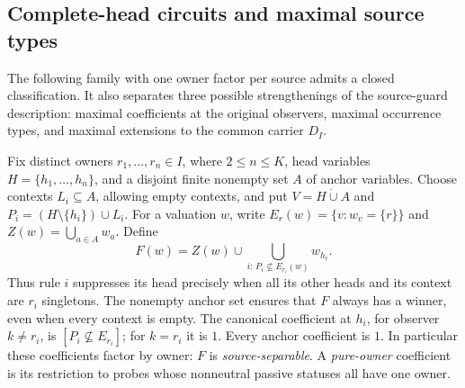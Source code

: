 \subsection{Complete-head circuits and maximal source types}
\label{app:core-head-circuits}

The following family with one owner factor per source admits a closed classification.
It also separates three possible strengthenings of the source-guard
description: maximal coefficients at the original observers, maximal
occurrence types, and maximal extensions to the common carrier $D_I$.

Fix distinct owners $r_1,\ldots,r_n\in I$, where $2\leq n\leq K$,
head variables $H=\{h_1,\ldots,h_n\}$, and a disjoint finite nonempty
set $A$ of anchor variables. Choose contexts $L_i\subseteq A$, allowing
empty contexts, and put
$V=H\mathbin{\dot\cup}A$ and $P_i=(H\setminus\{h_i\})\cup L_i$.
For a valuation $w$, write $E_r(w)=\{v:w_v=\{r\}\}$ and
$Z(w)=\bigcup_{a\in A}w_a$. Define
\begin{equation}\label{core:eq:head-function}
 F(w)=Z(w)\cup
       \bigcup_{i:\,P_i\nsubseteq E_{r_i}(w)}w_{h_i}.
\end{equation}
Thus rule $i$ suppresses its head precisely when all its other heads
and its context are $r_i$ singletons. The nonempty anchor set ensures
that $F$ always has a winner, even when every context is empty.
The canonical coefficient at $h_i$, for observer
$k\ne r_i$, is $[P_i\nsubseteq E_{r_i}]$; for $k=r_i$ it is $1$.
Every anchor coefficient is $1$. In particular these coefficients
factor by owner: $F$ is \emph{source-separable}. A \emph{pure-owner}
coefficient is its restriction to probes whose nonneutral passive
statuses all have one owner.

